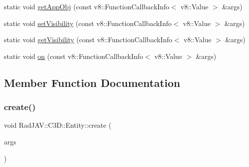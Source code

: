 \begin{DoxyCompactItemize}
\item 
static void \mbox{\hyperlink{class_rad_j_a_v_1_1_c3_d_1_1_entity_a0e8002d937c984ff4b52699d225a08cd}{get\+App\+Obj}} (const v8\+::\+Function\+Callback\+Info$<$ v8\+::\+Value $>$ \&args)
\item 
static void \mbox{\hyperlink{class_rad_j_a_v_1_1_c3_d_1_1_entity_a1123bd694cbd95e60f93f36f4aad0837}{set\+Visibility}} (const v8\+::\+Function\+Callback\+Info$<$ v8\+::\+Value $>$ \&args)
\item 
static void \mbox{\hyperlink{class_rad_j_a_v_1_1_c3_d_1_1_entity_a6c3a051030a96970d1e860550ece215a}{get\+Visibility}} (const v8\+::\+Function\+Callback\+Info$<$ v8\+::\+Value $>$ \&args)
\item 
static void \mbox{\hyperlink{class_rad_j_a_v_1_1_c3_d_1_1_entity_a317cafa4f3c1df9de3ea61594e7d88b4}{on}} (const v8\+::\+Function\+Callback\+Info$<$ v8\+::\+Value $>$ \&args)
\end{DoxyCompactItemize}


\subsection{Member Function Documentation}
\mbox{\label{class_rad_j_a_v_1_1_c3_d_1_1_entity_a347f17e461f890125265f869cac0c145}} 
\subsubsection{\texorpdfstring{create()}{create()}}
{\footnotesize\ttfamily void Rad\+J\+A\+V\+::\+C3\+D\+::\+Entity\+::create (\begin{DoxyParamCaption}\item[{const v8\+::\+Function\+Callback\+Info$<$ v8\+::\+Value $>$ \&}]{args }\end{DoxyParamCaption})\hspace{0.3cm}{\ttfamily [static]}}

\mbox{\label{class_rad_j_a_v_1_1_c3_d_1_1_entity_a53a03d847e306b8162bdd22f056585c4}} 
